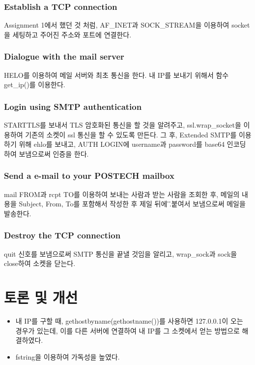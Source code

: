 \documentclass{article}
\begin{document}
    \subsubsection{Establish a TCP connection}
    Assignment 1에서 했던 것 처럼, AF\_INET과 SOCK\_STREAM을 이용하여 socket을 세팅하고 주어진 주소와 포트에 연결한다.

    \subsubsection{Dialogue with the mail server}
    HELO를 이용하여 메일 서버와 최초 통신을 한다. 내 IP를 보내기 위해서 함수 get\_ip()를 이용한다.

    \subsubsection{Login using SMTP authentication}
    STARTTLS를 보내서 TLS 암호화된 통신을 할 것을 알려주고, ssl.wrap\_socket을 이용하여 기존의 소켓이 ssl 통신을 할 수 있도록 만든다.
    그 후, Extended SMTP를 이용하기 위해 ehlo를 보내고, AUTH LOGIN에 username과 password를 base64 인코딩하여 보냄으로써 인증을 한다.

    \subsubsection{Send a e-mail to your POSTECH mailbox}
    mail FROM과 rcpt TO를 이용하여 보내는 사람과 받는 사람을 조회한 후, 메일의 내용을 Subject, From, To를 포함해서 작성한 후 제일 뒤에 \r\n.\r{} 붙여서 보냄으로써 메일을 발송한다.
    \subsubsection{Destroy the TCP connection}
    quit 신호를 보냄으로써 SMTP 통신을 끝낼 것임을 알리고, wrap\_sock과 sock을 close하여 소켓을 닫는다.

    \section{토론 및 개선}
    \begin{itemize}
        \item 내 IP를 구할 때, gethostbyname(gethostname())를 사용하면 127.0.0.1이 오는 경우가 있는데, 이를 다른 서버에 연결하여 내 IP를 그 소켓에서 얻는 방법으로 해결하였다.
        \item fstring을 이용하여 가독성을 높였다.
    \end{itemize}
\end{document}
